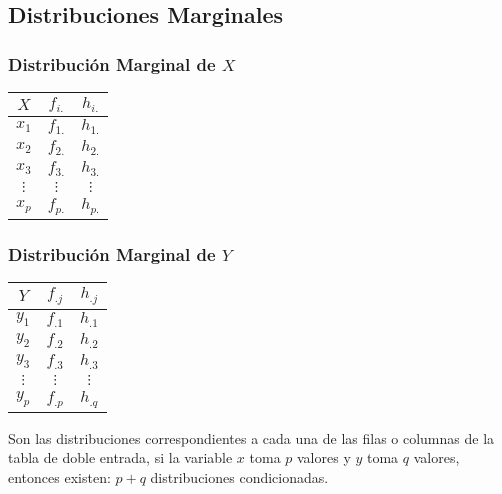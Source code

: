 \subsection{Distribuciones Marginales}
\begin{multicols}{2}
\subsubsection{Distribución Marginal de $X$}
\begin{center}
\begin{tabular}{|c|c|c|}
\hline 
$X$ & $f_{i.}$ & $h_{i.}$ \\ 
\hline 
$x_1$ & $f_{1.}$ & $h_{1.}$ \\ 
\hline 
$x_2$ & $f_{2.}$ & $h_{2.}$ \\ 
\hline 
$x_3$ & $f_{3.}$ & $h_{3.}$ \\ 
\hline 
$\vdots$ & $\vdots$ & $\vdots$ \\ 
\hline 
$x_p$ & $f_{p.}$ & $h_{p.}$ \\ 
\hline 
\end{tabular} 
\end{center}
\columnbreak
\subsubsection{Distribución Marginal de $Y$}
\begin{center}
\begin{tabular}{|c|c|c|}
\hline 
$Y$ & $f_{.j}$ & $h_{\textrm{.} j}$ \\ 
\hline 
$y_1$ & $f_{\textrm{.} 1}$ & $h_{\textrm{.} 1}$ \\ 
\hline 
$y_2$ & $f_{\textrm{.} 2}$ & $h_{\textrm{.} 2}$ \\ 
\hline 
$y_3$ & $f_{\textrm{.} 3}$ & $h_{\textrm{.} 3}$ \\ 
\hline 
$\vdots$ & $\vdots$ & $\vdots$ \\ 
\hline 
$y_p$ & $f_{.p}$ & $h_{\textrm{.} q}$ \\ 
\hline 
\end{tabular} 
\end{center}
\end{multicols}
Son las distribuciones correspondientes a cada una de las filas o columnas de la tabla de doble entrada, si la variable $x$ toma $p$ valores y $y$ toma $q$ valores, entonces existen: $p+q$ distribuciones condicionadas.